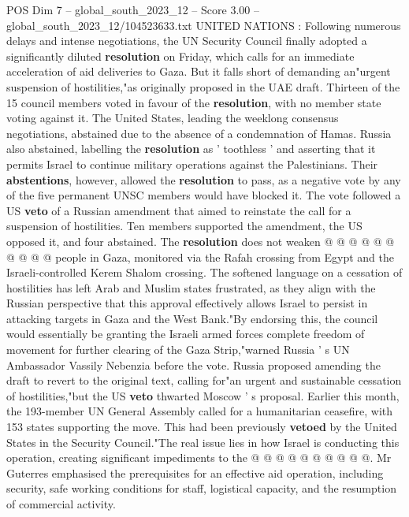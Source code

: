 \begin{textsample}{POS Dim 7 – global\_south\_2023\_12 – Score 3.00 – global\_south\_2023\_12/104523633.txt}  \label{ex:f7_pos_036}
UNITED NATIONS : Following numerous delays and intense negotiations, the UN Security Council finally adopted a significantly diluted \textbf{resolution} on Friday, which calls for an immediate acceleration of aid deliveries to Gaza.
But it falls short of demanding an"urgent suspension of hostilities,"as originally proposed in the UAE draft.
Thirteen of the 15 council members voted in favour of the \textbf{resolution}, with no member state voting against it.
The United States, leading the weeklong consensus negotiations, abstained due to the absence of a condemnation of Hamas.
Russia also abstained, labelling the \textbf{resolution} as ' toothless ' and asserting that it permits Israel to continue military operations against the Palestinians.
Their \textbf{abstentions}, however, allowed the \textbf{resolution} to pass, as a negative vote by any of the five permanent UNSC members would have blocked it.
The vote followed a US \textbf{veto} of a Russian amendment that aimed to reinstate the call for a suspension of hostilities.
Ten members supported the amendment, the US opposed it, and four abstained.
The \textbf{resolution} does not weaken @ @ @ @ @ @ @ @ @ @ people in Gaza, monitored via the Rafah crossing from Egypt and the Israeli-controlled Kerem Shalom crossing.
The softened language on a cessation of hostilities has left Arab and Muslim states frustrated, as they align with the Russian perspective that this approval effectively allows Israel to persist in attacking targets in Gaza and the West Bank."By endorsing this, the council would essentially be granting the Israeli armed forces complete freedom of movement for further clearing of the Gaza Strip,"warned Russia ' s UN Ambassador Vassily Nebenzia before the vote.
Russia proposed amending the draft to revert to the original text, calling for"an urgent and sustainable cessation of hostilities,"but the US \textbf{veto} thwarted Moscow ' s proposal.
Earlier this month, the 193-member UN General Assembly called for a humanitarian ceasefire, with 153 states supporting the move.
This had been previously \textbf{vetoed} by the United States in the Security Council."The real issue lies in how Israel is conducting this operation, creating significant impediments to the @ @ @ @ @ @ @ @ @ @.
Mr Guterres emphasised the prerequisites for an effective aid operation, including security, safe working conditions for staff, logistical capacity, and the resumption of commercial activity.

\end{textsample}
